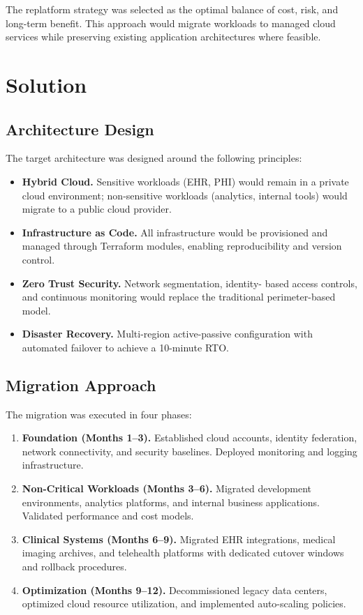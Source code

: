 \documentclass[
    language=english,
    doctype=article,
    institution=none,
]{../../omnilatex}
\begin{document}
The replatform strategy was selected as the optimal balance of cost,
risk, and long-term benefit. This approach would migrate workloads to
managed cloud services while preserving existing application architectures
where feasible.

\section{Solution}

\subsection{Architecture Design}

The target architecture was designed around the following principles:

\begin{itemize}
    \item \textbf{Hybrid Cloud.} Sensitive workloads (EHR, PHI) would
        remain in a private cloud environment; non-sensitive workloads
        (analytics, internal tools) would migrate to a public cloud
        provider.
    \item \textbf{Infrastructure as Code.} All infrastructure would be
        provisioned and managed through Terraform modules, enabling
        reproducibility and version control.
    \item \textbf{Zero Trust Security.} Network segmentation, identity-
        based access controls, and continuous monitoring would replace
        the traditional perimeter-based model.
    \item \textbf{Disaster Recovery.} Multi-region active-passive
        configuration with automated failover to achieve a 10-minute RTO.
\end{itemize}

\subsection{Migration Approach}

The migration was executed in four phases:

\begin{enumerate}
    \item \textbf{Foundation (Months 1--3).} Established cloud accounts,
        identity federation, network connectivity, and security
        baselines. Deployed monitoring and logging infrastructure.
    \item \textbf{Non-Critical Workloads (Months 3--6).} Migrated
        development environments, analytics platforms, and internal
        business applications. Validated performance and cost models.
    \item \textbf{Clinical Systems (Months 6--9).} Migrated EHR
        integrations, medical imaging archives, and telehealth platforms
        with dedicated cutover windows and rollback procedures.
    \item \textbf{Optimization (Months 9--12).} Decommissioned legacy
        data centers, optimized cloud resource utilization, and
        implemented auto-scaling policies.
\end{enumerate}
\end{document}

